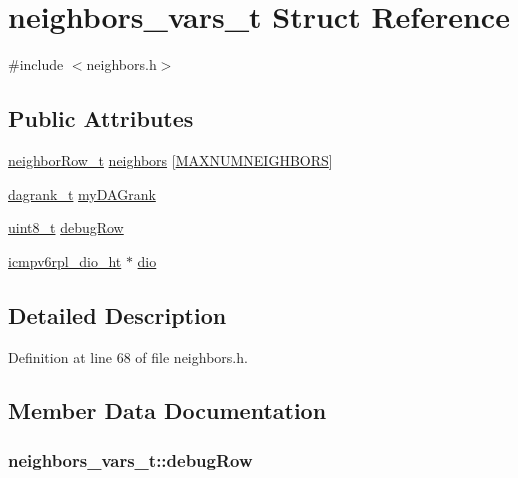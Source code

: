 \hypertarget{structneighbors__vars__t}{}\section{neighbors\+\_\+vars\+\_\+t Struct Reference}
\label{structneighbors__vars__t}


{\ttfamily \#include $<$neighbors.\+h$>$}

\subsection*{Public Attributes}
\begin{DoxyCompactItemize}
\item 
\hyperlink{structneighbor_row__t}{neighbor\+Row\+\_\+t} \hyperlink{structneighbors__vars__t_a0c28f8211f44d7a1ac87fb0f20832830}{neighbors} \mbox{[}\hyperlink{group___neighbors_gaf83606573bb704d34705b540c226a0d9}{M\+A\+X\+N\+U\+M\+N\+E\+I\+G\+H\+B\+O\+RS}\mbox{]}
\item 
\hyperlink{opendefs_8h_a502861d0bb432f5702761bd854023e21}{dagrank\+\_\+t} \hyperlink{structneighbors__vars__t_ad1da31e11ab0382ffbf1189e7803abcb}{my\+D\+A\+Grank}
\item 
\hyperlink{_p_e___types_8h_aba7bc1797add20fe3efdf37ced1182c5}{uint8\+\_\+t} \hyperlink{structneighbors__vars__t_a54be80f0acc1c14c93bd6006d0cec95b}{debug\+Row}
\item 
\hyperlink{structicmpv6rpl__dio__ht}{icmpv6rpl\+\_\+dio\+\_\+ht} $\ast$ \hyperlink{structneighbors__vars__t_a09c8cef2e547e5772a515f1eabcf6a50}{dio}
\end{DoxyCompactItemize}


\subsection{Detailed Description}


Definition at line 68 of file neighbors.\+h.



\subsection{Member Data Documentation}
\subsubsection[{\texorpdfstring{debug\+Row}{debugRow}}]{ neighbors\+\_\+vars\+\_\+t\+::debug\+Row}\hypertarget{structneighbors__vars__t_a54be80f0acc1c14c93bd6006d0cec95b}{}\label{structneighbors__vars__t_a54be80f0acc1c14c93bd6006d0cec95b}


